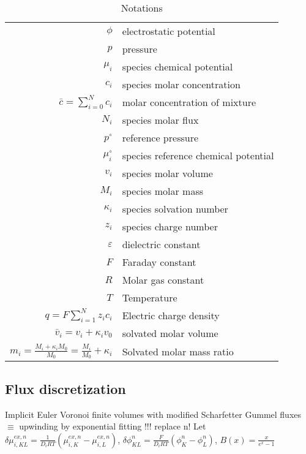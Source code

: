 \documentclass[12pt,oneside,reqno]{amsart}
\numberwithin{equation}{section}
\begin{document}
\begin{table}
  \begin{tabular}{rl}
    $\phi $ &electrostatic potential\\
    $p$ & pressure\\
    $\mu_i$& species chemical potential\\
    $c_i$& species molar concentration\\
    $  \bar c = \sum_{i=0}^N  c_i$& molar concentration of mixture\\
    $N_i$& species molar flux\\
    $p^\circ$ & reference pressure\\
    $\mu_i^\circ$& species reference chemical potential\\
    $v_i$ & species molar volume\\ 
    $M_i$ & species molar mass\\
    $\kappa_i$ & species solvation number\\
    $z_i$ & species charge number\\
    $\varepsilon$& dielectric constant\\
    $F$ & Faraday constant\\
    $R$ & Molar gas constant\\
    $T$ & Temperature\\
    $q=F\sum_{i=1}^N z_i c_i$ & Electric charge density\\
    $\bar v_i = v_i + \kappa_i v_0$ & solvated molar volume\\
    $m_i=\frac{M_i+\kappa_i M_0}{M_0}=\frac{M_i}{M_0}+\kappa_i$ & Solvated molar mass ratio
  \end{tabular}
  \medskip
  
  \caption{Notations}
  \label{tab:notations}
\end{table}

\subsection{Flux discretization}
Implicit Euler Voronoi finite volumes with modified Scharfetter Gummel fluxes
$\equiv$ upwinding by exponential fitting
!!! replace n!
Let $\delta\mu^{ex,n}_{i,KL}=\frac{1}{D_iRT}(\mu^{ex,n}_{i,K}-\mu^{ex,n}_{i,L})$, $\delta\phi^n_{KL}= \frac{F}{D_iRT}(\phi^n_K-\phi^n_L)$, $B(x)=\frac{x}{e^x-1}$
\end{document}
